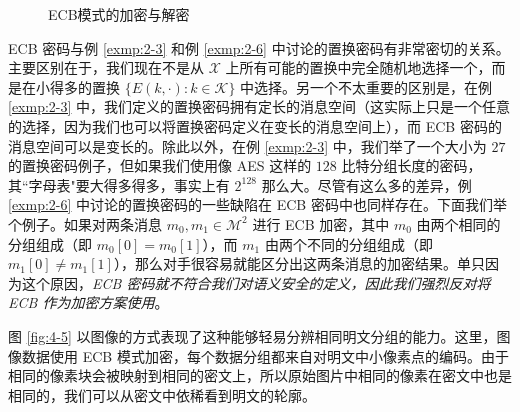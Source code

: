 \begin{figure}
  \centering
  \caption{ECB模式的加密与解密}
  \label{fig:4-4}
\end{figure}

ECB 密码与例 \ref{exmp:2-3} 和例 \ref{exmp:2-6} 中讨论的置换密码有非常密切的关系。主要区别在于，我们现在不是从 $\mathcal{X}$ 上所有可能的置换中完全随机地选择一个，而是在小得多的置换 $\{E(k,\cdot):k\in\mathcal{K}\}$ 中选择。另一个不太重要的区别是，在例 \ref{exmp:2-3} 中，我们定义的置换密码拥有定长的消息空间（这实际上只是一个任意的选择，因为我们也可以将置换密码定义在变长的消息空间上），而 ECB 密码的消息空间可以是变长的。除此以外，在例 \ref{exmp:2-3} 中，我们举了一个大小为 $27$ 的置换密码例子，但如果我们使用像 AES 这样的 $128$ 比特分组长度的密码，其``字母表"要大得多得多，事实上有 $2^{128}$ 那么大。尽管有这么多的差异，例 \ref{exmp:2-6} 中讨论的置换密码的一些缺陷在 ECB 密码中也同样存在。下面我们举个例子。如果对两条消息 $m_0,m_1\in\mathcal{M}^2$ 进行 ECB 加密，其中 $m_0$ 由两个相同的分组组成（即 $m_0[0]=m_0[1]$），而 $m_1$ 由两个不同的分组组成（即 $m_1[0]\neq m_1[1]$），那么对手很容易就能区分出这两条消息的加密结果。单只因为这个原因，\emph{ECB 密码就不符合我们对语义安全的定义，因此我们强烈反对将 ECB 作为加密方案使用}。

图 \ref{fig:4-5} 以图像的方式表现了这种能够轻易分辨相同明文分组的能力。这里，图像数据使用 ECB 模式加密，每个数据分组都来自对明文中小像素点的编码。由于相同的像素块会被映射到相同的密文上，所以原始图片中相同的像素在密文中也是相同的，我们可以从密文中依稀看到明文的轮廓。

